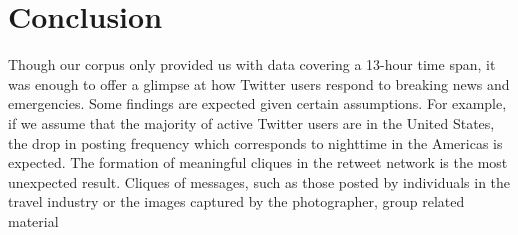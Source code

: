 \documentclass[a4paper, 11pt, titlepage]{article}
\begin{document}
\section{Conclusion}

Though our corpus only provided us with data covering a 13-hour time span, it was enough to offer a glimpse at how Twitter users respond to breaking news and emergencies.  Some findings are expected given certain assumptions.  For example, if we assume that the majority of active Twitter users are in the United States, the drop in posting frequency which corresponds to nighttime in the Americas is expected.  The formation of meaningful cliques in the retweet network is the most unexpected result.  Cliques of messages, such as those posted by individuals in the travel industry or the images captured by the photographer, group related material



\end{document}

